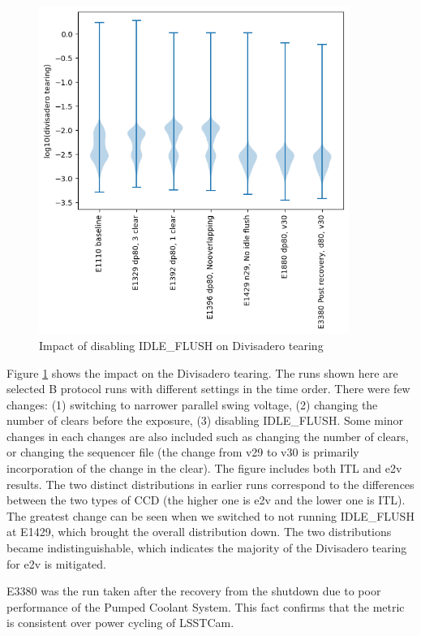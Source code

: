 \begin{figure}
\begin{centering}
\includegraphics[width=0.9\textwidth]{sections/figures/divisadero.png}
\end{centering}
\caption{Impact of disabling IDLE\_FLUSH on Divisadero tearing}\label{IdleFlushEffect:divisadero}
\end{figure}
Figure \ref{IdleFlushEffect:divisadero} shows the impact on the Divisadero tearing. The runs shown here are selected B protocol runs with different settings in the time order. There were few changes: (1) switching to narrower parallel swing voltage, (2) changing the number of clears before the exposure, (3) disabling IDLE\_FLUSH.  Some minor changes in each changes are also included such as changing the number of clears, or changing the sequencer file (the change from v29 to v30  is primarily incorporation of the change in the clear). The figure includes both ITL and e2v results. The two distinct distributions in earlier runs correspond to the differences between the two types of CCD (the higher one is e2v and the lower one is ITL). The greatest change can be seen when we switched to not running IDLE\_FLUSH at E1429, which brought the overall distribution down. The two distributions became indistinguishable, which indicates the majority of the Divisadero tearing for e2v is mitigated.

E3380 was the run taken after the recovery from the shutdown due to poor performance of the Pumped Coolant System. This fact confirms that the metric is consistent over power cycling of LSSTCam.

